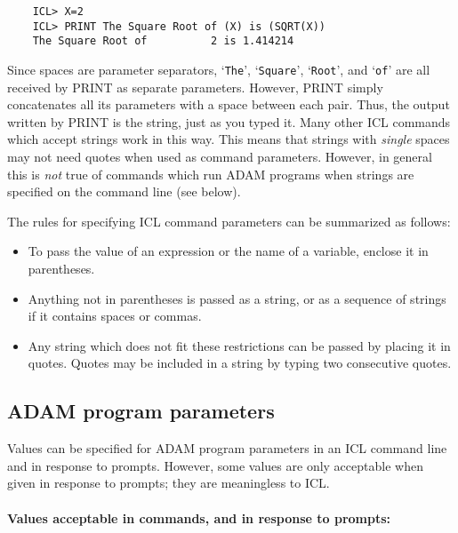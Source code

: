 \begin{small}
\begin{verbatim}
    ICL> X=2
    ICL> PRINT The Square Root of (X) is (SQRT(X))
    The Square Root of          2 is 1.414214
\end{verbatim}
\end{small}

Since spaces are parameter separators, `\verb+The+', `\verb+Square+',
`\verb+Root+', and `\verb+of+' are all received by PRINT as separate parameters.
However, PRINT simply concatenates all its parameters with a space between each
pair.
Thus, the output written by PRINT is the string, just as you typed it.
Many other ICL commands which accept strings work in this way.
This means that strings with {\em single} spaces may not need quotes when used
as command parameters.
However, in general this is {\em not} true of commands which run ADAM programs
when strings are specified on the command line (see below).

The rules for specifying ICL command parameters can be summarized as follows:
\begin{itemize}
\item To pass the value of an expression or the name of a variable, enclose it
 in parentheses.
\item Anything not in parentheses is passed as a string, or as a sequence of
 strings if it contains spaces or commas.
\item Any string which does not fit these restrictions can be passed by placing
 it in quotes.
 Quotes may be included in a string by typing two consecutive quotes.
\end{itemize}

\subsection{ADAM program parameters}

Values can be specified for ADAM program parameters in an ICL command line and
in response to prompts.
However, some values are only acceptable when given in response to prompts;
they are meaningless to ICL.

\paragraph{Values acceptable in commands, and in response to prompts:}\hfill

